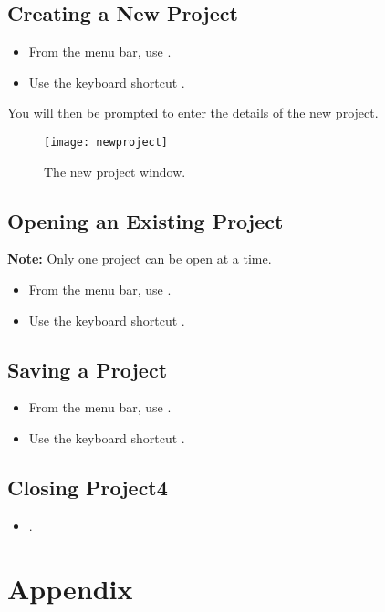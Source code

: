 \documentclass[11pt,fleqn]{book} %
\begin{document}
\section{Creating a New Project}
\begin{itemize}
  \item From the menu bar, use .
  \item Use the keyboard shortcut .
\end{itemize}
You will then be prompted to enter the details of the new project.

\begin{figure}[h]
  \centering
  \texttt{[image: newproject]}
  \caption{The new project window.\label{newproject}}
\end{figure}

\section{Opening an Existing Project}
\textbf{Note:} Only one project can be open at a time.
\begin{itemize}
  \item From the menu bar, use .
  \item Use the keyboard shortcut .
\end{itemize}

\section{Saving a Project}
\begin{itemize}
  \item From the menu bar, use .
  \item Use the keyboard shortcut .
\end{itemize}

\section{Closing Project4}
  \begin{itemize}
    \item {}.
  \end{itemize}

\appendix
\chapter{Appendix}
\end{document}

